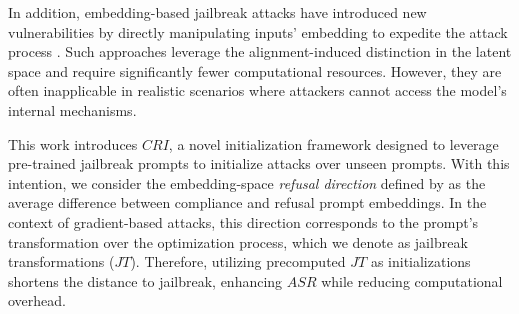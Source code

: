 In addition, embedding-based jailbreak attacks have introduced new vulnerabilities by directly manipulating inputs' embedding to expedite the attack process \cite{yu2024enhancing,arditi2024refusal}. Such approaches leverage the alignment-induced distinction in the latent space and require significantly fewer computational resources. However, they are often inapplicable in realistic scenarios where attackers cannot access the model’s internal mechanisms. 












This work introduces $CRI$, a novel initialization framework designed to leverage pre-trained jailbreak prompts to initialize attacks over unseen prompts. With this intention, we consider the embedding-space \emph{refusal direction} defined by \citet{arditi2024refusal} as the average difference between compliance and refusal prompt embeddings. In the context of gradient-based attacks, this direction corresponds to the prompt's transformation over the optimization process, which we denote as jailbreak transformations ($JT$). Therefore, utilizing precomputed $JT$ as initializations shortens the distance to jailbreak, enhancing $ASR$ while reducing computational overhead.


